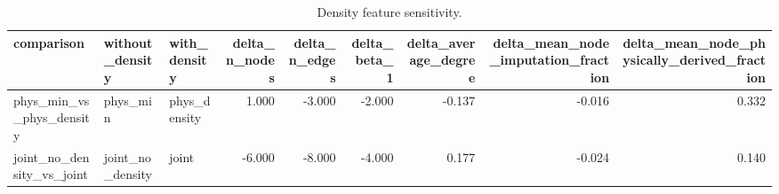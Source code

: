 \begin{table}
\caption{Density feature sensitivity.}
\label{tab:mapper_density_sensitivity}
\begin{tabular}{lllrrrrrr}
\toprule
comparison & without\_density & with\_density & delta\_n\_nodes & delta\_n\_edges & delta\_beta\_1 & delta\_average\_degree & delta\_mean\_node\_imputation\_fraction & delta\_mean\_node\_physically\_derived\_fraction \\
\midrule
phys\_min\_vs\_phys\_density & phys\_min & phys\_density & 1.000 & -3.000 & -2.000 & -0.137 & -0.016 & 0.332 \\
joint\_no\_density\_vs\_joint & joint\_no\_density & joint & -6.000 & -8.000 & -4.000 & 0.177 & -0.024 & 0.140 \\
\bottomrule
\end{tabular}
\end{table}
